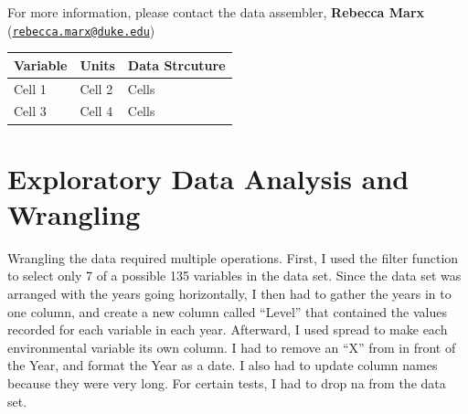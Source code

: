 \documentclass[12pt,]{article}
\begin{document}
For more information, please contact the data assembler, \textbf{Rebecca
Marx}
(\href{mailto:rebecca.marx@duke.edu}{\nolinkurl{rebecca.marx@duke.edu}})

\begin{longtable}[]{@{}lll@{}}
\toprule
Variable & Units & Data Strcuture\tabularnewline
\midrule
\endhead
Cell 1 & Cell 2 & Cells\tabularnewline
Cell 3 & Cell 4 & Cells\tabularnewline
\bottomrule
\end{longtable}

\newpage

\section{Exploratory Data Analysis and
Wrangling}\label{exploratory-data-analysis-and-wrangling}

Wrangling the data required multiple operations. First, I used the
filter function to select only 7 of a possible 135 variables in the data
set. Since the data set was arranged with the years going horizontally,
I then had to gather the years in to one column, and create a new column
called ``Level'' that contained the values recorded for each variable in
each year. Afterward, I used spread to make each environmental variable
its own column. I had to remove an ``X'' from in front of the Year, and
format the Year as a date. I also had to update column names because
they were very long. For certain tests, I had to drop na from the data
set.
\end{document}

